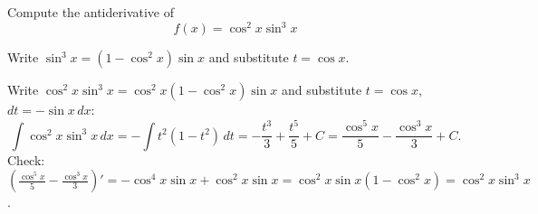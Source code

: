 
\begin{question}
Compute the antiderivative of
\[ f(x)=\cos^2x\sin^3x \]
\end{question}

\begin{hint}
Write $\sin^3x=(1-\cos^2x)\sin x$ and substitute $t=\cos x$.
\end{hint}

\begin{solution}
Write $\cos^2x\sin^3x=\cos^2x(1-\cos^2x)\sin x$ and substitute $t=\cos x$, $dt=-\sin x\,dx$:
\[ \int\cos^2x\sin^3x\,dx=-\int t^2(1-t^2)\,dt=-\frac{t^3}{3}+\frac{t^5}{5}+C=\boxed{\frac{\cos^5x}{5}-\frac{\cos^3x}{3}+C}. \]
Check: $\left(\frac{\cos^5x}{5}-\frac{\cos^3x}{3}\right)'=-\cos^4x\sin x+\cos^2x\sin x=\cos^2x\sin x(1-\cos^2x)=\cos^2x\sin^3x$.
\end{solution}
